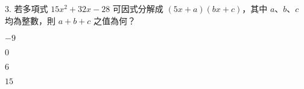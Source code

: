 \documentclass[12pt]{article}
\begin{document}
\begin{problem}
  \item[3.] 若多項式 $15x^2 + 32x - 28$ 可因式分解成 $(5x + a)(bx + c)$，其中 $a$、$b$、$c$ 均為整數，則 $a + b + c$ 之值為何？
  \begin{choices}
    \item $-9$
    \item $0$
    \item $6$
    \item $15$
  \end{choices}
\end{problem}
\end{document}
